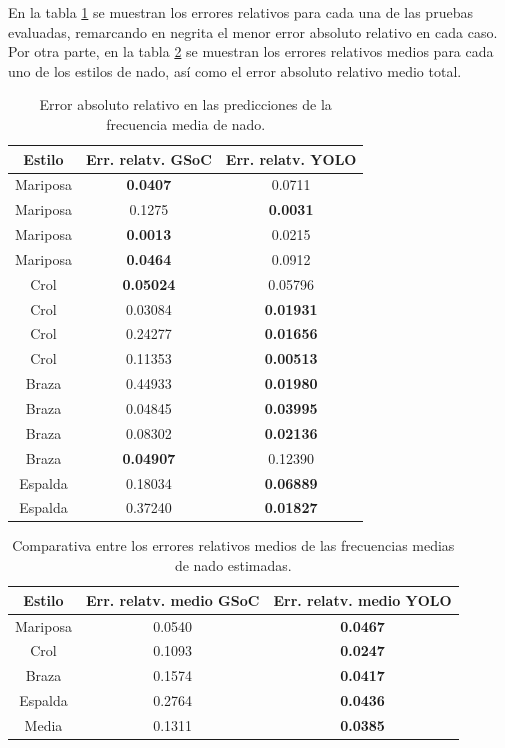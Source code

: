 En la tabla \ref{tab:tablaerroresprediccionesfrecuencia} se muestran los errores relativos para cada una de las pruebas evaluadas, remarcando en negrita el menor error absoluto relativo en cada caso. Por otra parte, en la tabla \ref{tab:tablaerroresmediosprediccionesfrecuencia} se muestran los errores relativos medios para cada uno de los estilos de nado, así como el error absoluto relativo medio total.

\begin{table}[]
    \centering
    \small
    \begin{tabular}{|c|c|c|} \hline
         Estilo & Err. relatv. GSoC & Err. relatv. YOLO  \\ \hline 
         Mariposa & \textbf{0.0407} & 0.0711 \\
         Mariposa & 0.1275 & \textbf{0.0031} \\
         Mariposa & \textbf{0.0013} & 0.0215 \\
         Mariposa & \textbf{0.0464} & 0.0912 \\
         Crol & \textbf{0.05024} & 0.05796 \\
         Crol & 0.03084 & \textbf{0.01931} \\
         Crol & 0.24277 & \textbf{0.01656} \\
         Crol & 0.11353 & \textbf{0.00513} \\
         Braza & 0.44933 & \textbf{0.01980} \\
         Braza & 0.04845 & \textbf{0.03995} \\
         Braza & 0.08302 & \textbf{0.02136} \\
         Braza & \textbf{0.04907} & 0.12390 \\
         Espalda & 0.18034 & \textbf{0.06889} \\
         Espalda & 0.37240 & \textbf{0.01827} \\ \hline
    \end{tabular}
    \caption{Error absoluto relativo en las predicciones de la frecuencia media de nado.}
    \label{tab:tablaerroresprediccionesfrecuencia}
\end{table}

\begin{table}[]
    \centering
    \small
    \begin{tabular}{|c|c|c|} \hline
         Estilo & Err. relatv. medio GSoC & Err. relatv. medio YOLO  \\ \hline
         Mariposa & 0.0540 & \textbf{0.0467} \\
         Crol & 0.1093 & \textbf{0.0247}  \\   
         Braza & 0.1574 & \textbf{0.0417} \\
         Espalda & 0.2764 & \textbf{0.0436} \\
         Media & 0.1311 & \textbf{0.0385} \\ \hline
    \end{tabular}
    \caption{Comparativa entre los errores relativos medios de las frecuencias medias de nado estimadas.}
    \label{tab:tablaerroresmediosprediccionesfrecuencia}
\end{table} 

